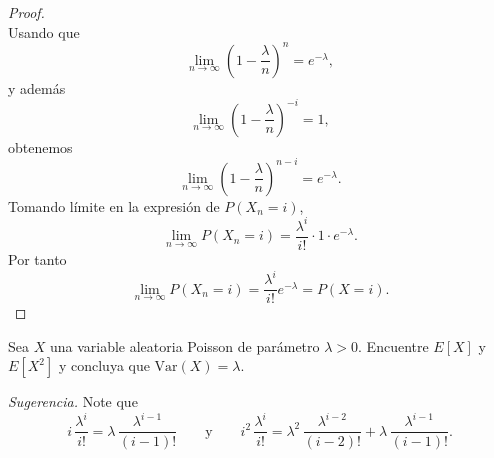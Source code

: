 \documentclass[12pt,a4paper]{article}
\newcommand{\paren}[1]{\left( #1 \right)}
\begin{document}
\begin{proof}
\begin{equation*}
        \end{equation*}
        Usando que
        \begin{equation*}
            \lim_{n\to\infty}\paren{1-\frac{\lambda}{n}}^{n}=e^{-\lambda},
        \end{equation*}
        y además
        \begin{equation*}
            \lim_{n\to\infty}\paren{1-\frac{\lambda}{n}}^{-i}=1,
        \end{equation*}
        obtenemos
        \begin{equation*}
            \lim_{n\to\infty}\paren{1-\frac{\lambda}{n}}^{n-i}=e^{-\lambda}.
        \end{equation*}
        Tomando límite en la expresión de $P(X_{n}=i)$,
        \begin{equation*}
            \lim_{n\to\infty}P(X_{n}=i)=\frac{\lambda^{i}}{i!}\cdot1\cdot e^{-\lambda}.
        \end{equation*}
        Por tanto
        \begin{equation*}
            \lim_{n\to\infty}P(X_{n}=i)=\frac{\lambda^{i}}{i!}e^{-\lambda}=P(X=i).
        \end{equation*}
    \end{proof}

    \begin{mdframed}[style=mdpinkbox, frametitle={Ejercicio 8}]
        Sea $X$ una variable aleatoria Poisson de parámetro $\lambda > 0$. Encuentre $E[X]$ y $E[X^2]$
        y concluya que $\mathrm{Var}(X) = \lambda$.

        \medskip
        \noindent\textit{Sugerencia.} Note que
        \begin{equation*}
            i\,\frac{\lambda^i}{i!} = \lambda\,\frac{\lambda^{i-1}}{(i-1)!}
            \qquad \text{y} \qquad
            i^2\,\frac{\lambda^i}{i!} = \lambda^2\,\frac{\lambda^{i-2}}{(i-2)!} + \lambda\,\frac{\lambda^{i-1}}{(i-1)!}.
        \end{equation*}
    \end{mdframed}
\end{document}
